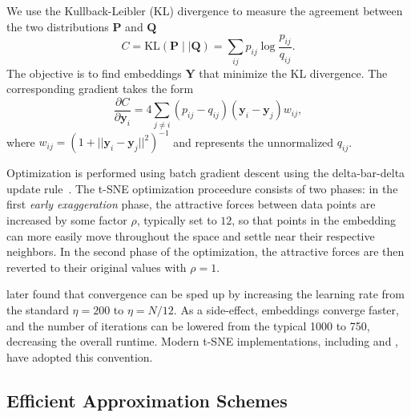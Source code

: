 \documentclass[article]{jss}
\newcommand{\opentsne}{\pkg{openTSNE}}
\begin{document}
We use the Kullback-Leibler (KL) divergence to measure the agreement
between the two distributions $\mathbf{P}$ and $\mathbf{Q}$
\begin{equation}
C = \text{KL}(\mathbf{P} \mid \mid \mathbf{Q}) = \sum_{ij} p_{ij} \log \frac{p_{ij}}{q_{ij}}.
\label{eq:kl_divergence}
\end{equation}
The objective is to find embeddings $\mathbf{Y}$ that minimize the KL divergence. The corresponding gradient takes the form
\begin{equation}
\frac{\partial C}{\partial \mathbf{y}_i} = 4 \sum_{j \neq i} \left ( p_{ij} - q_{ij} \right ) \left ( \mathbf{y}_i - \mathbf{y}_j \right ) w_{ij},
\label{eq:tsne_gradient}
\end{equation}
where $w_{ij} = \left ( 1 + || \mathbf{y}_i - \mathbf{y}_j || ^2 \right )^{-1}$
and represents the unnormalized $q_{ij}$.

Optimization is performed using batch gradient descent using the delta-bar-delta
update rule~\citep{jacobs1988increased}. The t-SNE optimization proceedure
consists of two phases: in the first \textit{early exaggeration} phase, the
attractive forces between data points are increased by some factor $\rho$,
typically set to $12$, so that points in the embedding can more easily move
throughout the space and settle near their respective neighbors. In the second
phase of the optimization, the attractive forces are then reverted to their
original values with $\rho=1$.

\citet{belkina2019automated} later found that convergence can be sped up by
increasing the learning rate from the standard $\eta=200$ to $\eta=N/12$. As a
side-effect, embeddings converge faster, and the number of iterations can be
lowered from the typical 1000 to 750, decreasing the overall runtime.  Modern
t-SNE implementations, including  and \opentsne, have adopted this
convention.

\subsection{Efficient Approximation Schemes} \label{sec:meth.approx}
\end{document}
